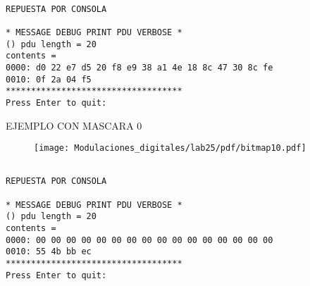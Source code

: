 \begin{verbatim}

REPUESTA POR CONSOLA 

* MESSAGE DEBUG PRINT PDU VERBOSE *
() pdu length = 20
contents =
0000: d0 22 e7 d5 20 f8 e9 38 a1 4e 18 8c 47 30 8c fe
0010: 0f 2a 04 f5
***********************************
Press Enter to quit:

\end{verbatim}

\begin{frame}{EJEMPLO CON MASCARA 0}

\begin{figure}[H]
\centering
\vspace{-3mm}
\texttt{[image: Modulaciones\_digitales/lab25/pdf/bitmap10.pdf]}
\end{figure}

\end{frame}


\begin{verbatim}

REPUESTA POR CONSOLA 

* MESSAGE DEBUG PRINT PDU VERBOSE *
() pdu length = 20
contents =
0000: 00 00 00 00 00 00 00 00 00 00 00 00 00 00 00 00
0010: 55 4b bb ec
***********************************
Press Enter to quit:

\end{verbatim}


